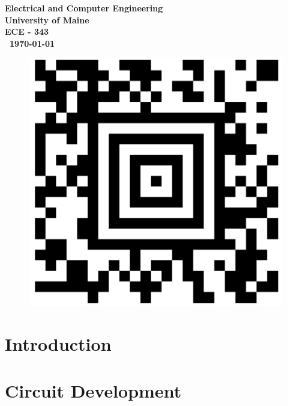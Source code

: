 \documentclass{article}
\begin{document}
\begin{titlepage}
\begin{center}
        
        \vspace{03cm}
        \textbf{
        Electrical and Computer Engineering\\
        University of Maine\\
        ECE - 343\\\ \today}
    \vspace{.5cm}
        \begin{figure}[H]
        \centering
        \includegraphics[scale = 0.1]{Images/barcode.png}
\end{figure}
    \end{center}
\end{titlepage}


\tableofcontents

\newpage

\newpage
\listoffigures
\newpage 
\clearpage




\section{Introduction}

  
 
  \section{Circuit Development}
    
  
\end{document}
